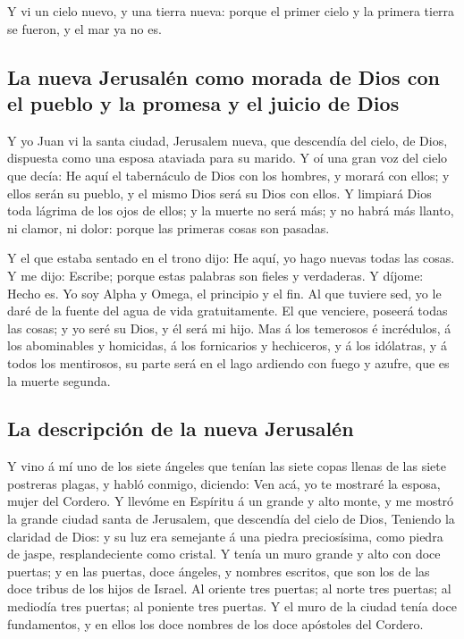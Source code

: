  Y vi un cielo nuevo, y una tierra nueva: porque el primer
cielo y la primera tierra se fueron, y el mar ya no es.

\hypertarget{la-nueva-jerusaluxe9n-como-morada-de-dios-con-el-pueblo-y-la-promesa-y-el-juicio-de-dios}{%
\subsection{La nueva Jerusalén como morada de Dios con el pueblo y la
promesa y el juicio de
Dios}\label{la-nueva-jerusaluxe9n-como-morada-de-dios-con-el-pueblo-y-la-promesa-y-el-juicio-de-dios}}

 Y yo Juan vi la santa ciudad, Jerusalem nueva, que
descendía del cielo, de Dios, dispuesta como una esposa ataviada para su
marido.  Y oí una gran voz del cielo que decía: He aquí el
tabernáculo de Dios con los hombres, y morará con ellos; y ellos serán
su pueblo, y el mismo Dios será su Dios con ellos.  Y
limpiará Dios toda lágrima de los ojos de ellos; y la muerte no será
más; y no habrá más llanto, ni clamor, ni dolor: porque las primeras
cosas son pasadas.

 Y el que estaba sentado en el trono dijo: He aquí, yo
hago nuevas todas las cosas. Y me dijo: Escribe; porque estas palabras
son fieles y verdaderas.  Y díjome: Hecho es. Yo soy Alpha
y Omega, el principio y el fin. Al que tuviere sed, yo le daré de la
fuente del agua de vida gratuitamente.  El que venciere,
poseerá todas las cosas; y yo seré su Dios, y él será mi hijo.
 Mas á los temerosos é incrédulos, á los abominables y
homicidas, á los fornicarios y hechiceros, y á los idólatras, y á todos
los mentirosos, su parte será en el lago ardiendo con fuego y azufre,
que es la muerte segunda.

\hypertarget{la-descripciuxf3n-de-la-nueva-jerusaluxe9n}{%
\subsection{La descripción de la nueva
Jerusalén}\label{la-descripciuxf3n-de-la-nueva-jerusaluxe9n}}

 Y vino á mí uno de los siete ángeles que tenían las siete
copas llenas de las siete postreras plagas, y habló conmigo, diciendo:
Ven acá, yo te mostraré la esposa, mujer del Cordero.  Y
llevóme en Espíritu á un grande y alto monte, y me mostró la grande
ciudad santa de Jerusalem, que descendía del cielo de Dios,
 Teniendo la claridad de Dios: y su luz era semejante á
una piedra preciosísima, como piedra de jaspe, resplandeciente como
cristal.  Y tenía un muro grande y alto con doce puertas;
y en las puertas, doce ángeles, y nombres escritos, que son los de las
doce tribus de los hijos de Israel.  Al oriente tres
puertas; al norte tres puertas; al mediodía tres puertas; al poniente
tres puertas.  Y el muro de la ciudad tenía doce
fundamentos, y en ellos los doce nombres de los doce apóstoles del
Cordero.

